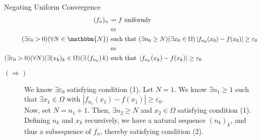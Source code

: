 \documentclass[10pt]{extarticle}
\newcommand{\N}{\mathbbm{N}}
\begin{document}
  \begin{problem}{Negating Uniform Convergence}
    \begin{align*}
      (f_n)_n &\nrightarrow f \text{ uniformly }\\
              &\Leftrightarrow\\
      (\exists \varepsilon_0 > 0)(\forall N\in\N)&\text{ such that } (\exists n_0 \geq N)(\exists x_0\in\Omega) \left|f_{n_0}(x_0) - f(x_0)\right| \geq \varepsilon_0\\
                                                 &\Leftrightarrow\\
      (\exists \varepsilon_0 > 0)(\forall N)(\exists (x_k)_k\in\Omega)(\exists \left(f_{n_k}\right)k) &\text{ such that } \left|f_{n_k}(x_k) - f(x_k)\right| \geq \varepsilon_0
    \end{align*}
    \tcblower
    \begin{description}
      \item[$(\Rightarrow)$] We know $\exists \varepsilon_0$ satisfying condition (1). Let $N = 1$. We know $\exists n_1 \geq 1$ such that $\exists x_1\in\Omega$ with $|f_{n_1}(x_1) - f(x_1)| \geq \varepsilon_0$.\\

        Now, set $N = n_1 + 1$. Then, $\exists n_2 \geq N$ and $x_2\in\Omega$ satisfying condition (1).\\

        Defining $n_k$ and $x_k$ recursively, we have a natural sequence $(n_k)_k$, and thus a subsequence of $f_n$, thereby satisfying condition (2).
    \end{description}
  \end{problem}
\end{document}
